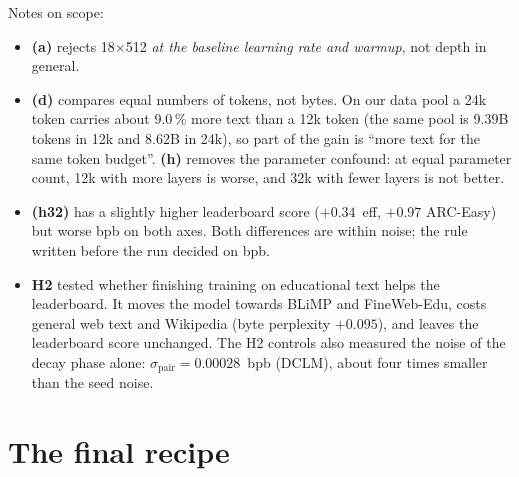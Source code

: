 Notes on scope:
\begin{itemize}
  \item \textbf{(a)} rejects 18$\times$512 \emph{at the baseline learning rate and warmup}, not depth in general.
  \item \textbf{(d)} compares equal numbers of tokens, not bytes. On our data pool a 24k token carries about 9.0\,\%
  more text than a 12k token (the same pool is 9.39B tokens in 12k and 8.62B in 24k), so part of the gain is ``more
  text for the same token budget''. \textbf{(h)} removes the parameter confound: at equal parameter count, 12k with
  more layers is worse, and 32k with fewer layers is not better.
  \item \textbf{(h32)} has a slightly higher leaderboard score ($+0.34$~eff, $+0.97$ ARC-Easy) but worse bpb on both
  axes. Both differences are within noise; the rule written before the run decided on bpb.
  \item \textbf{H2} tested whether finishing training on educational text helps the leaderboard. It moves the model
  towards BLiMP and FineWeb-Edu, costs general web text and Wikipedia (byte perplexity $+0.095$), and leaves the
  leaderboard score unchanged. The H2 controls also measured the noise of the decay phase alone:
  $\sigma_{\mathrm{pair}} = 0.00028$~bpb (DCLM), about four times smaller than the seed noise.
\end{itemize}

\section{The final recipe}

